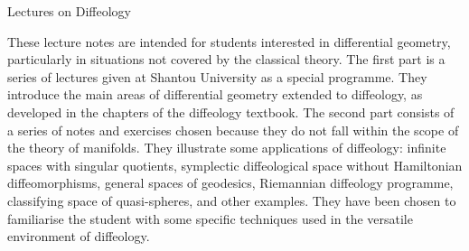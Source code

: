 
\newpage
\thispagestyle{empty}

\centerline{\Large \sf Lectures on Diffeology}
\bigskip \bigskip

\footnotesize

These lecture notes are intended for students interested in differential geometry,
particularly in situations not covered by the classical theory.
The first part is a series of lectures given at Shantou University as a special programme.
They introduce the main areas of differential geometry extended to diffeology,
as developed in the chapters of the diffeology textbook.
The second part consists of a series of notes and exercises chosen because they do not fall within the scope of the theory of manifolds.
They illustrate some applications of diffeology:
infinite spaces with singular quotients,
symplectic diffeological space without Hamiltonian diffeomorphisms,
general spaces of geodesics,
Riemannian diffeology programme,
classifying space of quasi-spheres,
and other examples.
They have been chosen to familiarise the student with some specific techniques used in the versatile environment of diffeology.

